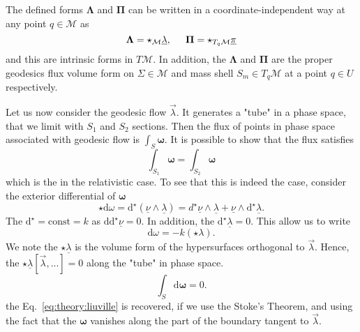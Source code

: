 %
The defined forms $\boldsymbol{\Lambda}$ and $\boldsymbol{\Pi}$ can be written in a 
coordinate-independent way at any point $q\in\mathcal{M}$ as 
%
\begin{equation}
\boldsymbol{\Lambda} = \star_{\mathcal{M}}\underline{\lambda}, \hspace{5mm} \boldsymbol{\Pi} = \star_{T_q\mathcal{M}}\underline{\pi}
\end{equation}
%
and this are intrinsic forms in $T\mathcal{M}$. 
In addition, the $\boldsymbol{\Lambda}$ and $\boldsymbol{\Pi}$ are the proper geodesics flux
volume form on $\Sigma\in\mathcal{M}$ and mass shell $S_m\in T_q\mathcal{M}$ at a point $q\in U$ respectively. 


Let us now consider the geodesic flow $\vec{\lambda}$. It generates a "tube" in a phase space, 
that we limit with $S_1$ and $S_2$ sections. Then the flux of points in phase space associated with 
geodesic flow is $\int_{S}\boldsymbol{\omega}$. 
It is possible to show that the flux satisfies
%
\begin{equation}
\int_{S_1}\boldsymbol{\omega} = \int_{S_2}\boldsymbol{\omega}
\label{eq:theory:liuville}
\end{equation}
%
which is the  in the relativistic case. 
%
To see that this is indeed the case, consider the exterior differential of $\boldsymbol{\omega}$
%
\begin{equation}
\star\text{d}\omega = \text{d}^{\star}(\underline{\nu}\wedge\underline{\lambda}) = d^{\star}\underline{\nu}\wedge\underline{\lambda} + \underline{\nu}\wedge\text{d}^{\star}\underline{\lambda}.
\end{equation}
%
The $\text{d}^{\star}=\text{const}=k$ as $\text{dd}^{\star}\underline{\nu}=0$. 
In addition, the $\text{d}^{\star}\underline{\lambda}=0$. 
This allow us to write 
%
\begin{equation}
\text{d}\omega = -k(\star\lambda).
\end{equation}
%
We note the $\star\underline{\lambda}$ is the volume form of the hypersurfaces orthogonal to $\vec{\lambda}$.
Hence, the $\star\underline{\lambda}[\vec{\lambda},...]=0$ along the "tube" in phase space. 
%
\begin{equation}
\int_S\text{d}\boldsymbol{\omega} = 0.
\end{equation}
%
the Eq.~\eqref{eq:theory:liuville} is recovered, if we use the Stoke’s Theorem, 
and using the fact that the $\boldsymbol{\omega}$ vanishes along the part of the boundary tangent to $\vec{\lambda}$.
%



